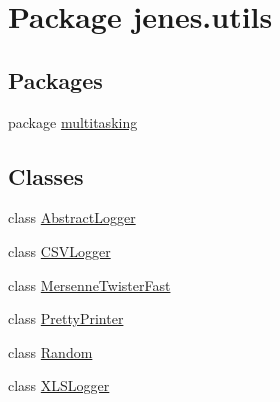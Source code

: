 \hypertarget{namespacejenes_1_1utils}{\section{Package jenes.\-utils}
\label{namespacejenes_1_1utils}
}
\subsection*{Packages}
\begin{DoxyCompactItemize}
\item 
package \hyperlink{namespacejenes_1_1utils_1_1multitasking}{multitasking}
\end{DoxyCompactItemize}
\subsection*{Classes}
\begin{DoxyCompactItemize}
\item 
class \hyperlink{classjenes_1_1utils_1_1_abstract_logger}{Abstract\-Logger}
\item 
class \hyperlink{classjenes_1_1utils_1_1_c_s_v_logger}{C\-S\-V\-Logger}
\item 
class \hyperlink{classjenes_1_1utils_1_1_mersenne_twister_fast}{Mersenne\-Twister\-Fast}
\item 
class \hyperlink{classjenes_1_1utils_1_1_pretty_printer}{Pretty\-Printer}
\item 
class \hyperlink{classjenes_1_1utils_1_1_random}{Random}
\item 
class \hyperlink{classjenes_1_1utils_1_1_x_l_s_logger}{X\-L\-S\-Logger}
\end{DoxyCompactItemize}
